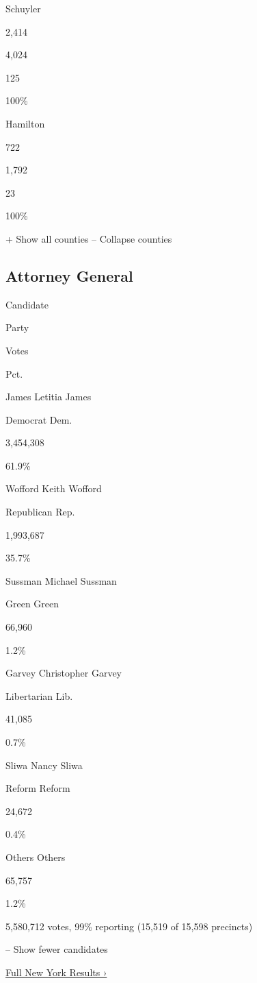 Schuyler

2,414

4,024

125

100\%

Hamilton

722

1,792

23

100\%

+ Show all counties -- Collapse counties

\hypertarget{attorney-general}{%
\subsection{Attorney General}\label{attorney-general}}

Candidate

Party

Votes

Pct.

 James Letitia James

Democrat Dem.

3,454,308

61.9\%

 Wofford Keith Wofford

Republican Rep.

1,993,687

35.7\%

 Sussman Michael Sussman

Green Green

66,960

1.2\%

 Garvey Christopher Garvey

Libertarian Lib.

41,085

0.7\%

 Sliwa Nancy Sliwa

Reform Reform

24,672

0.4\%

 Others Others

65,757

1.2\%

5,580,712 votes, 99\% reporting (15,519 of 15,598 precincts)

-- Show fewer candidates

\href{https://www.nytimes3xbfgragh.onion/interactive/2018/11/06/us/elections/results-new-york-elections.html}{Full
New York Results ›}

